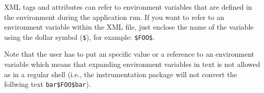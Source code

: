 XML tags and attributes can refer to environment variables that are defined in the environment during the application run. If you want to refer to an environment variable within the XML file, just enclose the name of the variable using the dollar symbol ({\tt \$}), for example: {\tt \$FOO\$}.

Note that the user has to put an specific value or a reference to an environment variable which means that expanding environment variables in text is not allowed as in a regular shell (i.e., the instrumentation package will not convert the follwing text {\tt bar\$FOO\$bar}).


